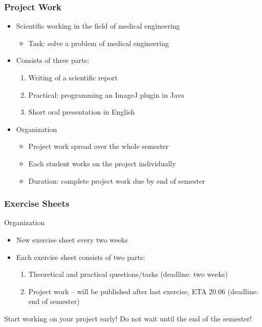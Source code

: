 \begin{frame}
	\frametitle{Project Work}
	\begin{itemize}
		\item Scientific working in the field of medical engineering
			\begin{itemize}
				\item Task: solve a problem of medical engineering
			\end{itemize}
		\item Consists of three parts:
			\begin{enumerate}
				\item Writing of a scientific report
				\item Practical: programming an ImageJ plugin in Java
				\item Short oral presentation in English
			\end{enumerate}
		\item Organization
			\begin{itemize}
				\item Project work spread over the whole semester
				\item Each student works on the project individually
				\item Duration: complete project work due by end of semester 
			\end{itemize}
	\end{itemize}
\end{frame}

\begin{frame}
	\frametitle{Exercise Sheets}
	\begin{block}{Organization}
		\begin{itemize}
			\item New exercise sheet every two weeks
			\item Each exercise sheet consists of two parts:
				\begin{enumerate}
					\item Theoretical and practical questions/tasks (deadline: two weeks)
					\item Project work -- will be published after last exercise, ETA 20.06 (deadline: end of
						semester)
				\end{enumerate}
		\end{itemize}
	\end{block}
	\vspace{-\bigskipamount}
	\begin{center}
	\alert{Start working on your project early!
		Do not wait until the end of the
		semester!}
\end{center}
					
\end{frame}


